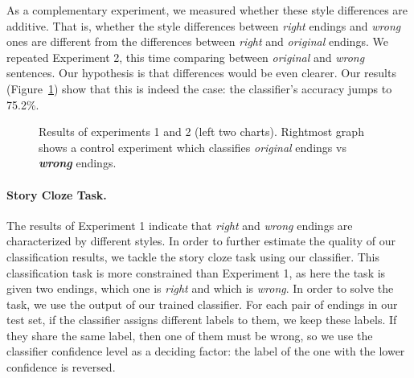 \documentclass[11pt,a4paper]{article}
\newcommand{\figref}[1]{Figure~\ref{#1}}
\begin{document}
As a complementary experiment, we measured whether these style differences are additive. 
That is, whether the style differences between {\it right} endings and {\it wrong} ones are different from the differences between {\it right} and {\it original} endings.
We repeated Experiment 2, this time comparing between {\it original} and {\it wrong} sentences. 
Our hypothesis is that differences would be even clearer. 
Our results (\figref{results}) show that this is indeed the case: the classifier's accuracy jumps to 75.2\%.

\begin{figure}
\caption{\label{results} Results of  experiments 1 and 2 (left two charts). 
Rightmost graph shows a control experiment which classifies {\it original} endings vs \textit{\textbf{wrong}} endings. }
\end{figure}


\paragraph{Story Cloze Task.}
The results of Experiment 1 indicate that {\it right} and {\it wrong} endings are characterized by different styles.
In order to further estimate the quality of our classification results, we tackle the story cloze task using our classifier.
This classification task is more constrained than Experiment 1, as here the task is given two endings, which one is {\it right} and which is {\it wrong}.
In order to solve the task, we use the output of our trained classifier. 
For each pair of endings in our test set, if the classifier assigns different labels to them, we keep these labels. 
If they share the same label, then one of them must be wrong, so we use the classifier confidence level as a deciding factor: the label of the one with the lower confidence is reversed. 
\end{document}
